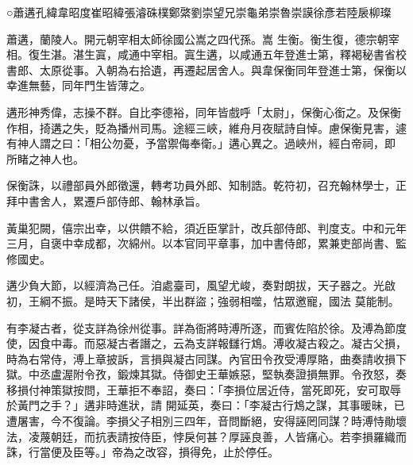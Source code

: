 
\begin{pinyinscope}

 ○蕭遘孔緯韋昭度崔昭緯張濬硃樸鄭綮劉崇望兄崇龜弟崇魯崇謨徐彥若陸扆柳璨



 蕭遘，蘭陵人。開元朝宰相太師徐國公嵩之四代孫。嵩
 生衡。衡生復，德宗朝宰相。復生湛。湛生寘，咸通中宰相。寘生遘，以咸通五年登進士第，釋褐秘書省校書郎、太原從事。入朝為右拾遺，再遷起居舍人。與韋保衡同年登進士第，保衡以幸進無藝，同年門生皆薄之。



 遘形神秀偉，志操不群。自比李德裕，同年皆戲呼「太尉」，保衡心銜之。及保衡作相，掎遘之失，貶為播州司馬。途經三峽，維舟月夜賦詩自悼。慮保衡見害，遽有神人謂之曰：「相公勿憂，予當禦侮奉衛。」遘心異之。過峽州，經白帝祠，即
 所睹之神人也。



 保衡誅，以禮部員外郎徵還，轉考功員外郎、知制誥。乾符初，召充翰林學士，正拜中書舍人，累遷戶部侍郎、翰林承旨。



 黃巢犯闕，僖宗出幸，以供饋不給，須近臣掌計，改兵部侍郎、判度支。中和元年三月，自褒中幸成都，次綿州。以本官同平章事，加中書侍郎，累兼吏部尚書、監修國史。



 遘少負大節，以經濟為己任。洎處臺司，風望尤峻，奏對朗拔，天子器之。光啟初，王綱不振。是時天下諸侯，半出群盜；強弱相噬，怙眾邀寵，國法
 莫能制。



 有李凝古者，從支詳為徐州從事。詳為衙將時溥所逐，而賓佐陷於徐。及溥為節度使，因食中毒。而惡凝古者譖之，云為支詳報讎行鴆。溥收凝古殺之。凝古父損，時為右常侍，溥上章披訴，言損與凝古同謀。內官田令孜受溥厚賂，曲奏請收損下獄。中丞盧渥附令孜，鍛煉其獄。侍御史王華嫉惡，堅執奏證損無罪。令孜怒，奏移損付神策獄按問，王華拒不奉詔，奏曰：「李損位居近侍，當死即死，安可取辱於黃門之手？」遘非時進狀，請
 開延英，奏曰：「李凝古行鴆之謀，其事暖昧，已遭屠害，今不復論。李損父子相別三四年，音問斷絕，安得誣罔同謀？時溥恃勛壞法，凌蔑朝廷，而抗表請按侍臣，悖戾何甚？厚誣良善，人皆痛心。若李損羅織而誅，行當便及臣等。」帝為之改容，損得免，止於停任。




\end{pinyinscope}

